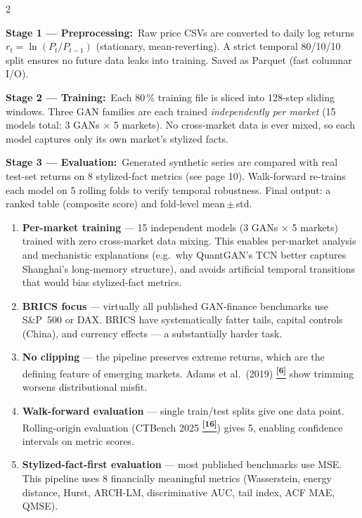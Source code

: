 \documentclass[10pt]{article}
\newcommand{\navybox}[2]{\begin{tcolorbox}[mybox={Navy}{LBg},title={#1}]#2\end{tcolorbox}}
\newcommand{\skybox}[2]{\begin{tcolorbox}[mybox={Sky}{BBg},title={#1}]#2\end{tcolorbox}}
\newcommand{\tcite}[1]{%
  \hyperlink{R:#1}{\textsuperscript{\scriptsize\textbf{[#1]}}}}
\begin{document}
\vspace{6pt}
\begin{multicols}{2}

\navybox{What Each Stage Does}{%
\textbf{Stage 1 — Preprocessing:}\ Raw price CSVs are converted to daily log returns
$r_t = \ln(P_t/P_{t-1})$ (stationary, mean-reverting). A strict temporal 80/10/10 split ensures no future data leaks into training. Saved as Parquet (fast columnar I/O).

\smallskip
\textbf{Stage 2 — Training:}\ Each 80\,\% training file is sliced into 128-step sliding windows. Three GAN families are each trained \emph{independently per market} (15 models total: 3 GANs $\times$ 5 markets). No cross-market data is ever mixed, so each model captures only its own market's stylized facts.

\smallskip
\textbf{Stage 3 — Evaluation:}\ Generated synthetic series are compared with real test-set returns on 8 stylized-fact metrics (see page 10). Walk-forward re-trains each model on 5 rolling folds to verify temporal robustness. Final output: a ranked table (composite score) and fold-level mean\,$\pm$\,std.}

\skybox{What Makes This Pipeline Scientifically Novel}{%
\begin{enumerate}
  \item \textbf{Per-market training} --- 15 independent models (3 GANs $\times$ 5 markets) trained with zero cross-market data mixing. This enables per-market analysis and mechanistic explanations (e.g.\ why QuantGAN's TCN better captures Shanghai's long-memory structure), and avoids artificial temporal transitions that would bias stylized-fact metrics.
  \item \textbf{BRICS focus} --- virtually all published GAN-finance benchmarks use S\&P~500 or DAX. BRICS have systematically fatter tails, capital controls (China), and currency effects --- a substantially harder task.
  \item \textbf{No clipping} --- the pipeline preserves extreme returns, which are the defining feature of emerging markets. Adams et al.\ (2019)\tcite{6} show trimming worsens distributional misfit.
  \item \textbf{Walk-forward evaluation} --- single train/test splits give one data point. Rolling-origin evaluation (CTBench 2025\tcite{16}) gives 5, enabling confidence intervals on metric scores.
  \item \textbf{Stylized-fact-first evaluation} --- most published benchmarks use MSE. This pipeline uses 8 financially meaningful metrics (Wasserstein, energy distance, Hurst, ARCH-LM, discriminative AUC, tail index, ACF MAE, QMSE).
\end{enumerate}}


\end{multicols}
\end{document}
